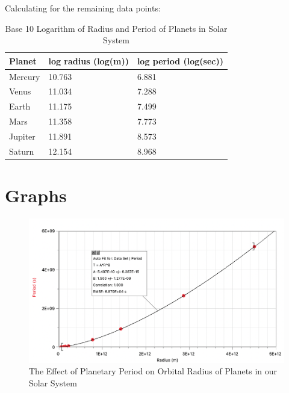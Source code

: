 \documentclass[12pt]{article}
\begin{document}
Calculating for the remaining data points:\\

\begin{table}[!ht]
    \centering
    \begin{tabular}{|l|l|l|}
    \hline
        Planet & log radius (log(m)) & log period (log(sec)) \\ \hline \hline
        Mercury & 10.763 & 6.881 \\ \hline
        Venus & 11.034 & 7.288 \\ \hline
        Earth & 11.175 & 7.499 \\ \hline
        Mars & 11.358 & 7.773 \\ \hline
        Jupiter & 11.891 & 8.573 \\ \hline
        Saturn & 12.154 & 8.968 \\ \hline
    \end{tabular}
     \caption{Base 10 Logarithm of Radius and Period of Planets in Solar System}
\end{table}
\vspace*{1cm}
\pagebreak

\section{Graphs}

\begin{figure}[h]
\begin{center}
\hspace*{-1cm} \includegraphics[scale=.60]{graph} 
\caption{The Effect of Planetary Period on Orbital Radius of Planets in our Solar System}
\end{center}
\end{figure}
\end{document}
